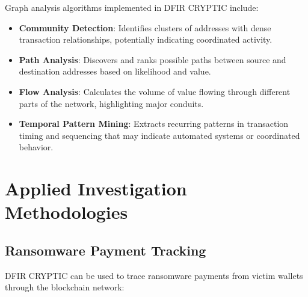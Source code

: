 \documentclass[conference]{IEEEtran}
\begin{document}
Graph analysis algorithms implemented in DFIR CRYPTIC include:

\begin{itemize}
    \item \textbf{Community Detection}: Identifies clusters of addresses with dense transaction relationships, potentially indicating coordinated activity.
    
    \item \textbf{Path Analysis}: Discovers and ranks possible paths between source and destination addresses based on likelihood and value.
    
    \item \textbf{Flow Analysis}: Calculates the volume of value flowing through different parts of the network, highlighting major conduits.
    
    \item \textbf{Temporal Pattern Mining}: Extracts recurring patterns in transaction timing and sequencing that may indicate automated systems or coordinated behavior.
\end{itemize}

\section{Applied Investigation Methodologies}

\subsection{Ransomware Payment Tracking}

DFIR CRYPTIC can be used to trace ransomware payments from victim wallets through the blockchain network:
\end{document}
